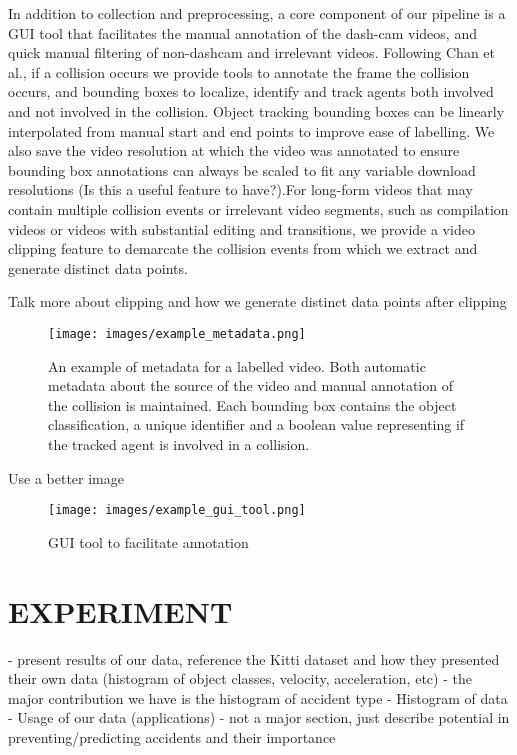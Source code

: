 \documentclass[letterpaper, 10 pt, conference]{IEEEconf}
\newcommand{\todo}[1]{{\color{red}#1}}
\begin{document}
In addition to collection and preprocessing, a core component of our pipeline is a GUI tool that facilitates the manual annotation of the dash-cam videos, and quick manual filtering of non-dashcam and irrelevant videos. Following Chan et al.\cite{chan2016anticipating}, if a collision occurs we provide tools to annotate the frame the collision occurs, and bounding boxes to localize, identify and track agents both involved and not involved in the collision. Object tracking bounding boxes can be linearly interpolated from manual start and end points to improve ease of labelling. We also save the video resolution at which the video was annotated to ensure bounding box annotations can always be scaled to fit any variable download resolutions (\todo{Is this a useful feature to have?}).For long-form videos that may contain multiple collision events or irrelevant video segments, such as compilation videos or videos with substantial editing and transitions, we provide a video clipping feature to demarcate the collision events from which we extract and generate distinct data points. 

\todo{Talk more about clipping and how we generate distinct data points after clipping}



\begin{figure}[htpb]
		\centering
		\texttt{[image: images/example\_metadata.png]}
		\caption{An example of metadata for a labelled video. Both automatic metadata about the source of the video and manual annotation of the collision is maintained. Each bounding box contains the object classification, a unique identifier and a boolean value representing if the tracked agent is involved in a collision.}
		\label{fig:images-example_metadata-png}
\end{figure}


\todo{Use a better image}

\begin{figure}[htpb]
		\centering
		\texttt{[image: images/example\_gui\_tool.png]}
		\caption{GUI tool to facilitate annotation}
		\label{fig:example_gui_tool-png}
\end{figure}

\section{EXPERIMENT}
- present results of our data, reference the Kitti dataset and how they presented their own data (histogram of object classes, velocity, acceleration, etc)
- the major contribution we have is the histogram of accident type
- Histogram of data
- Usage of our data (applications) - not a major section, just describe potential in preventing/predicting accidents and their importance
\end{document}
